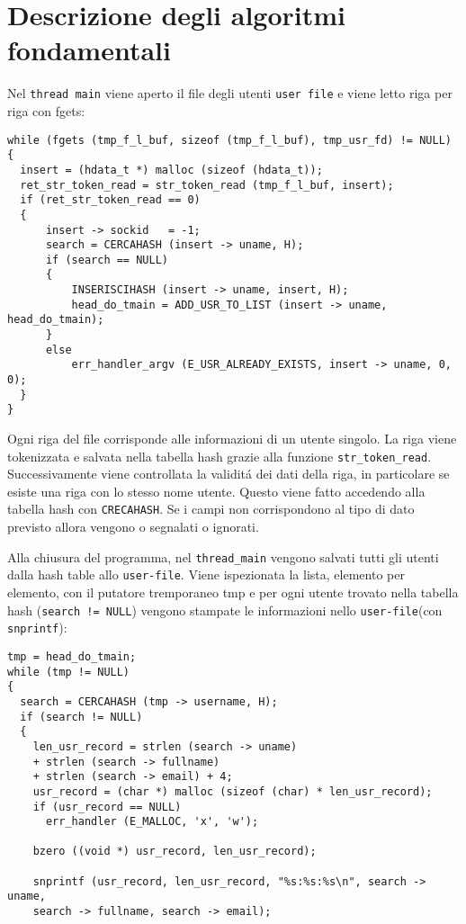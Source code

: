\documentclass[12pt a4paper oneside]{article}
\begin{document}
{		\section{Descrizione degli algoritmi fondamentali}
			\par
			Nel \texttt{thread main} viene aperto il file degli utenti \texttt{user file} e viene letto riga per riga con fgets:
			\begin{verbatim}
while (fgets (tmp_f_l_buf, sizeof (tmp_f_l_buf), tmp_usr_fd) != NULL)
{
  insert = (hdata_t *) malloc (sizeof (hdata_t));
  ret_str_token_read = str_token_read (tmp_f_l_buf, insert);
  if (ret_str_token_read == 0)
  {
      insert -> sockid   = -1;
      search = CERCAHASH (insert -> uname, H);
      if (search == NULL)
      {
          INSERISCIHASH (insert -> uname, insert, H);
          head_do_tmain = ADD_USR_TO_LIST (insert -> uname, head_do_tmain);
      }
      else
          err_handler_argv (E_USR_ALREADY_EXISTS, insert -> uname, 0, 0);
  }
}
			\end{verbatim}
			Ogni riga del file corrisponde alle informazioni di un utente singolo. La riga viene tokenizzata e salvata nella tabella hash grazie alla funzione \texttt{str\_token\_read}. Successivamente viene controllata la validit\'a dei dati della riga, in particolare se esiste una riga con lo stesso nome utente. Questo viene fatto accedendo alla tabella hash con \texttt{CRECAHASH}. Se i campi non corrispondono al tipo di dato previsto allora vengono o segnalati o ignorati.
			\par
			Alla chiusura del programma, nel \texttt{thread\_main} vengono salvati tutti gli utenti dalla hash table allo \texttt{user-file}. Viene ispezionata la lista, elemento per elemento, con il putatore tremporaneo tmp e per ogni utente trovato nella tabella hash (\texttt{search != NULL}) vengono stampate le informazioni nello \texttt{user-file}\newline(con \texttt{snprintf}):
			\begin{verbatim}
tmp = head_do_tmain;
while (tmp != NULL)
{
  search = CERCAHASH (tmp -> username, H);
  if (search != NULL)
  {
    len_usr_record = strlen (search -> uname)
    + strlen (search -> fullname)
    + strlen (search -> email) + 4;
    usr_record = (char *) malloc (sizeof (char) * len_usr_record);
    if (usr_record == NULL)
      err_handler (E_MALLOC, 'x', 'w');

    bzero ((void *) usr_record, len_usr_record);

    snprintf (usr_record, len_usr_record, "%s:%s:%s\n", search -> uname,
    search -> fullname, search -> email);


\end{verbatim}}
\end{document}
